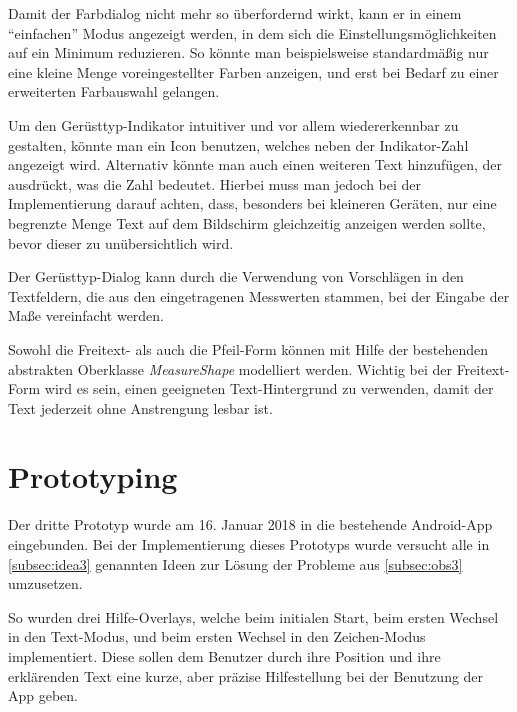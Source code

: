 Damit der Farbdialog nicht mehr so überfordernd wirkt, kann er in einem ``einfachen'' Modus angezeigt werden, in dem sich die Einstellungsmöglichkeiten auf ein Minimum reduzieren.
So könnte man beispielsweise standardmäßig nur eine kleine Menge voreingestellter Farben anzeigen, und erst bei Bedarf zu einer erweiterten Farbauswahl gelangen. \\

Um den Gerüsttyp-Indikator intuitiver und vor allem wiedererkennbar zu gestalten, könnte man ein Icon benutzen, welches neben der Indikator-Zahl angezeigt wird.
Alternativ könnte man auch einen weiteren Text hinzufügen, der ausdrückt, was die Zahl bedeutet.
Hierbei muss man jedoch bei der Implementierung darauf achten, dass, besonders bei kleineren Geräten, nur eine begrenzte Menge Text auf dem Bildschirm gleichzeitig anzeigen werden sollte, bevor dieser zu unübersichtlich wird. \\

Der Gerüsttyp-Dialog kann durch die Verwendung von Vorschlägen in den Textfeldern, die aus den eingetragenen Messwerten stammen, bei der Eingabe der Maße vereinfacht werden. \\

Sowohl die Freitext- als auch die Pfeil-Form können mit Hilfe der bestehenden abstrakten Oberklasse \emph{MeasureShape} modelliert werden.
Wichtig bei der Freitext-Form wird es sein, einen geeigneten Text-Hintergrund zu verwenden, damit der Text jederzeit ohne Anstrengung lesbar ist.

\section{Prototyping}
Der dritte Prototyp wurde am 16. Januar 2018 in die bestehende Android-App eingebunden.
Bei der Implementierung dieses Prototyps wurde versucht alle in \autoref{subsec:idea3} genannten Ideen zur Lösung der Probleme aus \autoref{subsec:obs3} umzusetzen.

So wurden drei Hilfe-Overlays, welche beim initialen Start, beim ersten Wechsel in den Text-Modus, und beim ersten Wechsel in den Zeichen-Modus implementiert.
Diese sollen dem Benutzer durch ihre Position und ihre erklärenden Text eine kurze, aber präzise Hilfestellung bei der Benutzung der App geben.

